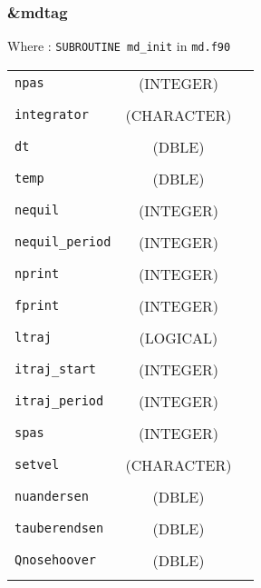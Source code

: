 \documentclass[10pt,a4paper]{article}
\begin{document}
\subsubsection{\&mdtag}

Where : \verb?SUBROUTINE md_init? in \verb?md.f90?

\begin{tabular}{lcc}
\\
\verb?npas? & (INTEGER)  & \\
\\
\verb?integrator? & (CHARACTER)  & \\
\\
\verb?dt? & (DBLE)  & \\
\\
\verb?temp? & (DBLE)  & \\
\\
\verb?nequil? & (INTEGER)  & \\
\\
\verb?nequil_period? & (INTEGER) & \\
\\
\verb?nprint? & (INTEGER) & \\
\\
\verb?fprint? & (INTEGER) & \\
\\
\verb?ltraj? & (LOGICAL) & \\
\\
\verb?itraj_start? & (INTEGER) & \\
\\
\verb?itraj_period? & (INTEGER) & \\
\\
\verb?spas? & (INTEGER) & \\
\\
\verb?setvel? & (CHARACTER) & \\
\\
\verb?nuandersen? & (DBLE) & \\
\\
\verb?tauberendsen? & (DBLE) & \\
\\
\verb?Qnosehoover? & (DBLE) & \\
\\
\end{tabular}

\end{document}
